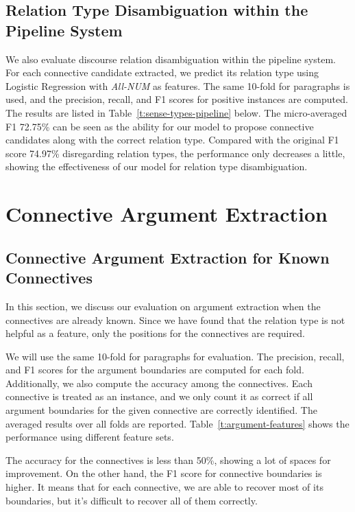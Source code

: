 

\subsection{Relation Type Disambiguation within the Pipeline System}

We also evaluate discourse relation disambiguation within the pipeline system.
For each connective candidate extracted, we predict its relation type using
Logistic Regression with \textit{All-NUM} as features.
The same 10-fold for paragraphs is used, and the precision, recall, and F1 scores
for positive instances are computed. The results are listed in
Table~\ref{t:sense-types-pipeline} below. The micro-averaged F1 72.75\% can be seen
as the ability for our model to propose connective candidates along with the correct
relation type. Compared with the original F1 score 74.97\% disregarding relation types,
the performance only decreases a little, showing the effectiveness of our
model for relation type disambiguation.



\section{Connective Argument Extraction}

\subsection{Connective Argument Extraction for Known Connectives}

In this section, we discuss our evaluation on argument extraction when the
connectives are already known. Since we have found that the relation type
is not helpful as a feature, only the positions for the connectives are required.

We will use the same 10-fold for paragraphs for evaluation.
The precision, recall, and F1 scores for the argument boundaries are
computed for each fold. Additionally, we also compute the accuracy among the 
connectives. Each connective is treated as an instance, and we only count it
as correct if all argument boundaries for the given connective are correctly identified.
The averaged results over all folds are reported. Table~\ref{t:argument-features} shows
the performance using different feature sets.

The accuracy for the connectives is less than 50\%, showing a lot of spaces for
improvement. On the other hand, the F1 score for connective boundaries is higher.
It means that for each connective, we are able to recover most of its
boundaries, but it's difficult to recover all of them correctly.

